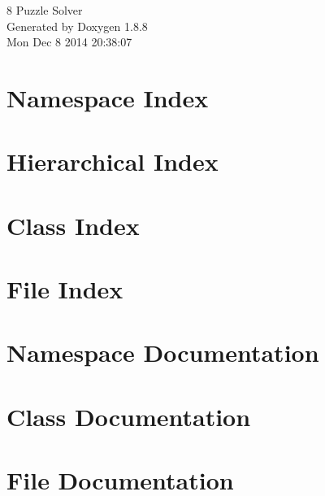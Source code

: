 \documentclass[twoside]{book}
\newcommand{\+}{\discretionary{\mbox{\scriptsize$\hookleftarrow$}}{}{}}
\newcommand{\clearemptydoublepage}{%
  \newpage{\pagestyle{empty}\cleardoublepage}%
}
\begin{document}
\begin{titlepage}
\vspace*{7cm}
\begin{center}%
{\Large 8 Puzzle Solver }\\
\vspace*{1cm}
{\large Generated by Doxygen 1.8.8}\\
\vspace*{0.5cm}
{\small Mon Dec 8 2014 20:38:07}\\
\end{center}
\end{titlepage}
\clearemptydoublepage
\tableofcontents
\clearemptydoublepage
{}

\chapter{Namespace Index}

\chapter{Hierarchical Index}

\chapter{Class Index}

\chapter{File Index}

\chapter{Namespace Documentation}



\chapter{Class Documentation}











\chapter{File Documentation}












\newpage
{}
{}
\printindex
\end{document}
